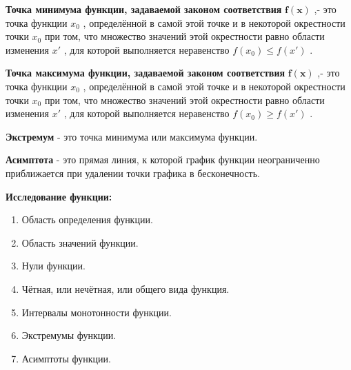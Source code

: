 \documentclass[oneside]{book}
\begin{document}
	\textbf{Точка минимума функции, задаваемой законом соответствия}
	\begin{math}
		\mathbf{f(x)}
	\end{math}
	,- это точка функции
	\begin{math}
		x_0
	\end{math}
	, определённой в самой этой точке и
	в некоторой окрестности точки
	\begin{math}
		x_0
	\end{math}
	при том, что множество значений этой окрестности
	равно области изменения
	\begin{math}
		x'
	\end{math}
	,
	для которой выполняется
	неравенство
	\begin{math}
		f(x_0) \leq f(x')
	\end{math}
	.

	\textbf{Точка максимума функции, задаваемой законом соответствия}
	\begin{math}
		\mathbf{f(x)}
	\end{math}
	,- это точка функции
	\begin{math}
		x_0
	\end{math}
	, определённой в самой этой точке и
	в некоторой окрестности точки
	\begin{math}
		x_0
	\end{math}
	при том, что множество значений этой окрестности
	равно области изменения
	\begin{math}
		x'
	\end{math}
	,
	для которой выполняется
	неравенство
	\begin{math}
		f(x_0) \geq f(x')
	\end{math}
	.

	\textbf{Экстремум} - это точка
	минимума или максимума функции.

	\textbf{Асимптота} - это прямая линия,
	к которой график функции неограниченно
	приближается при удалении точки
	графика в бесконечность.

	\textbf{Исследование функции:}
	\begin{enumerate}
		\item Область определения функции.
		\item Область значений функции.
		\item Нули функции.
		\item Чётная, или нечётная, или общего вида функция.
		\item Интервалы монотонности функции.
		\item Экстремумы функции.
		\item Асимптоты функции.
	\end{enumerate}
\end{document}
